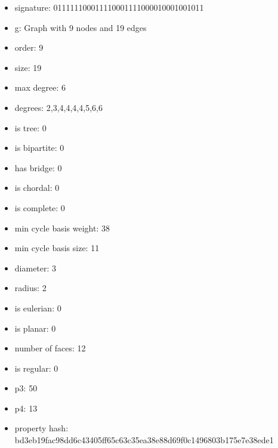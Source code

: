 \newpage
\begin{figure}
\end{figure}
\begin{itemize}
\item signature: 011111100011110001111000010001001011
\item g: Graph with 9 nodes and 19 edges
\item order: 9
\item size: 19
\item max degree: 6
\item degrees: 2,3,4,4,4,4,5,6,6
\item is tree: 0
\item is bipartite: 0
\item has bridge: 0
\item is chordal: 0
\item is complete: 0
\item min cycle basis weight: 38
\item min cycle basis size: 11
\item diameter: 3
\item radius: 2
\item is eulerian: 0
\item is planar: 0
\item number of faces: 12
\item is regular: 0
\item p3: 50
\item p4: 13
\item property hash: bd3eb19fac98dd6c43405ff65c63c35ea38e88d69f0c1496803b175e7e38ede1
\end{itemize}
